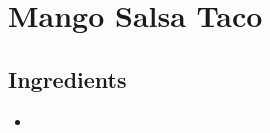 \thispagestyle{fancy}
\section{Mango Salsa Taco}
\AddToShipoutPicture*{\MangoSalsaTaco}

\subsection*{Ingredients}
\begin{multicols}{3}
	\begin{itemize}
		\item 
	\end{itemize}
\end{multicols}